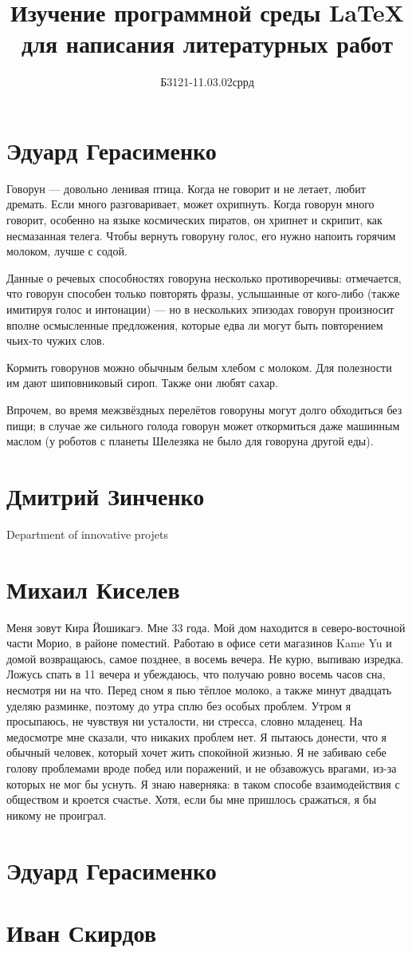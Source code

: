 \documentclass[labwork]{fefudoc}
\author{Б3121-11.03.02сррд}{Дмитрий Зинченко}
\title{Изучение программной среды \LaTeX{} для написания литературных работ}
\begin{document}
\frontpage
\tableofcontents

\section{Эдуард Герасименко}
Говорун — довольно ленивая птица. Когда не говорит и не летает, любит дремать. Если много разговаривает, может охрипнуть. Когда говорун много говорит, особенно на языке космических пиратов, он хрипнет и скрипит, как несмазанная телега. Чтобы вернуть говоруну голос, его нужно напоить горячим молоком, лучше с содой.

Данные о речевых способностях говоруна несколько противоречивы: отмечается, что говорун способен только повторять фразы, услышанные от кого-либо (также имитируя голос и интонации) — но в нескольких эпизодах говорун произносит вполне осмысленные предложения, которые едва ли могут быть повторением чьих-то чужих слов.

Кормить говорунов можно обычным белым хлебом с молоком. Для полезности им дают шиповниковый сироп. Также они любят сахар.

Впрочем, во время межзвёздных перелётов говоруны могут долго обходиться без пищи; в случае же сильного голода говорун может откормиться даже машинным маслом (у роботов с планеты Шелезяка не было для говоруна другой еды).

\section{Дмитрий Зинченко}
Department of innovative projets
\section{Михаил Киселев}
Меня зовут Кира Йошикагэ. Мне 33 года. Мой дом находится в северо-восточной части Морио, в районе поместий. Работаю в офисе сети магазинов Kame Yu и домой возвращаюсь, самое позднее, в восемь вечера.
Не курю, выпиваю изредка. Ложусь спать в 11 вечера и убеждаюсь, что получаю ровно восемь часов сна, несмотря ни на что. Перед сном я пью тёплое молоко, а также минут двадцать уделяю разминке, поэтому до утра сплю без особых проблем.
Утром я просыпаюсь, не чувствуя ни усталости, ни стресса, словно младенец. На медосмотре мне сказали, что никаких проблем нет. Я пытаюсь донести, что я обычный человек, который хочет жить спокойной жизнью. Я не забиваю себе голову проблемами вроде побед или поражений, и не обзавожусь врагами, из-за которых не мог бы уснуть. 
Я знаю наверняка: в таком способе взаимодействия с обществом и кроется счастье. Хотя, если бы мне пришлось сражаться, я бы никому не проиграл.

\section{Эдуард Герасименко}
\section{Иван Скирдов}
\end{document}
